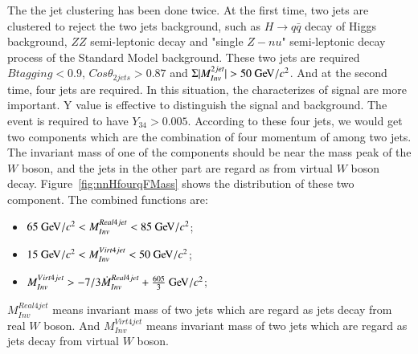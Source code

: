 \documentclass[11pt,a4paper]{cepcnote}
\begin{document}
The the jet clustering has been done twice. At the first time, 
two jets are clustered to reject the two jets background, such as $H\rightarrow q\bar{q}$ decay of Higgs background, 
$ZZ$ semi-leptonic decay and "single $Z-nu$" semi-leptonic decay process of the Standard Model background. 
These two jets are required $Btagging < 0.9$, $Cos\theta_{2jets} > 0.87$ and $\Sigma|M_{Inv}^{2jet}| > 50\gev/c^2$. 
And at the second time, four jets are required. In this situation, the characterizes of signal are more important. 
Y value is effective to distinguish the signal and background. The event is required to have $Y_{34} > 0.005$. 
According to these four jets, we would get two components which are the combination of four momentum of among two jets. 
The invariant mass of one of the components should be near the mass peak of the $W$ boson, and the jets in the other part 
are regard as from virtual $W$ boson decay. Figure~\ref{fig:nnHfourqFMass} shows the distribution of these two component. 
The combined functions are:
\begin{itemize}
	\item $ 65\gev/c^2 < M_{Inv}^{Real4jet} < 85\gev/c^2$;
	\item $ 15\gev/c^2 < M_{Inv}^{Virt4jet} < 50\gev/c^2$;
	\item $ M_{Inv}^{Virt4jet} > -7/3\dot M_{Inv}^{Real4jet} + \frac{605}{3}\gev/c^2$;
\end{itemize}
$M_{Inv}^{Real4jet}$ means invariant mass of two jets which are regard as jets decay from real $W$ boson. 
And $M_{Inv}^{Virt4jet}$ means invariant mass of two jets which are regard as jets decay from virtual $W$ boson.
\end{document}
